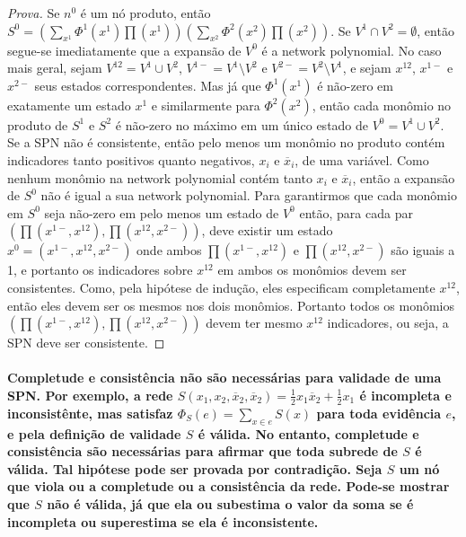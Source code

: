 \documentclass[a4paper,10pt]{article}
\theoremstyle{plain}
\begin{document}
\begin{proof}[Prova]
  Se $n^0$ é um nó produto, então $S^0=(\sum_{x^1}\Phi^1(x^1)\prod(x^1))(\sum_{x^2}\Phi^2(x^2)\prod
  (x^2))$. Se $V^1 \cap V^2 = \emptyset$, então segue-se imediatamente que a expansão de $V^0$ é a
  network polynomial. No caso mais geral, sejam $V^{12}=V^1 \cup V^2$, $V^{1-}=V^1 \setminus V^2$
  e $V^{2-}=V^2 \setminus V^1$, e sejam $x^{12}$, $x^{1-}$ e $x^{2-}$ seus estados
  correspondentes. Mas já que $\Phi^1(x^1)$ é não-zero em exatamente um estado $x^1$ e similarmente
  para $\Phi^2(x^2)$, então cada monômio no produto de $S^1$ e $S^2$ é não-zero no máximo em um
  único estado de $V^0 = V^1 \cup V^2$. Se a SPN não é consistente, então pelo menos um monômio no
  produto contém indicadores tanto positivos quanto negativos, $x_i$ e $\overline{x}_i$, de uma
  variável. Como nenhum monômio na network polynomial contém tanto $x_i$ e $\overline{x}_i$, então
  a expansão de $S^0$ não é igual a sua network polynomial. Para garantirmos que cada monômio em
  $S^0$ seja não-zero em pelo menos um estado de $V^0$ então, para cada par $(\prod(x^{1-},
  x^{12}), \prod(x^{12}, x^{2-}))$, deve existir um estado $x^0=(x^{1-},x^{12},x^{2-})$ onde
  ambos $\prod(x^{1-},x^{12})$ e $\prod(x^{12},x^{2-})$ são iguais a 1, e portanto os indicadores
  sobre $x^12$ em ambos os monômios devem ser consistentes. Como, pela hipótese de indução, eles
  especificam completamente $x^{12}$, então eles devem ser os mesmos nos dois monômios. Portanto
  todos os monômios $(\prod(x^{1-},x^{12}), \prod(x^{12},x^{2-}))$ devem ter mesmo $x^{12}$
  indicadores, ou seja, a SPN deve ser consistente.
\end{proof}

\paragraph{
  Completude e consistência não são necessárias para validade de uma SPN. Por exemplo, a rede
  $S(x_1,x_2,\overline{x}_2,\overline{x}_2) = \frac{1}{2}x_1\overline{x}_2 + \frac{1}{2}x_1$ é
  incompleta e inconsistênte, mas satisfaz $\Phi_S(e) = \sum_{x \in e} S(x)$ para toda evidência
  $e$, e pela definição de validade $S$ é válida. No entanto, completude e consistência são
  necessárias para afirmar que toda subrede de $S$ é válida. Tal hipótese pode ser provada por
  contradição. Seja $S$ um nó que viola ou a completude ou a consistência da rede. Pode-se mostrar
  que $S$ não é válida, já que ela ou subestima o valor da soma se é incompleta ou superestima se
  ela é inconsistente.
}

\newpage

\printbibliography
\end{document}
